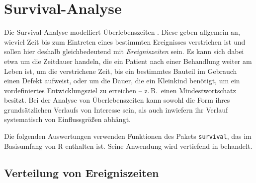 \chapter{Survival-Analyse}
\label{sec:survival}

Die Survival-Analyse modelliert Überlebenszeiten \cite{HosmerJr2008,Klein2003}. Diese geben allgemein an, wieviel Zeit bis zum Eintreten eines bestimmten Ereignisses verstrichen ist und sollen hier deshalb gleichbedeutend mit \emph{Ereigniszeiten} sein. Es kann sich dabei etwa um die Zeitdauer handeln, die ein Patient nach einer Behandlung weiter am Leben ist, um die verstrichene Zeit, bis ein bestimmtes Bauteil im Gebrauch einen Defekt aufweist, oder um die Dauer, die ein Kleinkind benötigt, um ein vordefiniertes Entwicklungsziel zu erreichen -- z.\,B.\ einen Mindestwortschatz besitzt. Bei der Analyse von Überlebenszeiten kann sowohl die Form ihres grundsätzlichen Verlaufs von Interesse sein, als auch inwiefern ihr Verlauf systematisch von Einflussgrößen abhängt.

Die folgenden Auswertungen verwenden Funktionen des Pakets \lstinline!survival!, das im Basisumfang von R enthalten ist. Seine Anwendung wird vertiefend in  behandelt.

\section{Verteilung von Ereigniszeiten}
\label{sec:survDistrib}

